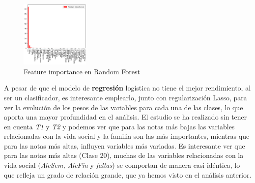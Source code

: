 \documentclass{article}
\begin{document}
\begin{figure}[ht]
  \centering
  \includegraphics[width=0.3\textwidth]{RF_var.png}
  \caption{Feature importance en Random Forest}\label{fig:t1t2}
\end{figure}

A pesar de que el modelo de \textbf{regresión} logística no tiene el mejor rendimiento, al ser un clasificador, es interesante emplearlo, junto con regularización Lasso, para ver la evolución de los pesos de las variables para cada una de las clases, lo que aporta una mayor profundidad en el análisis.
El estudio se ha realizado sin tener en cuenta \textit{T1} y \textit{T2} y podemos ver que para las notas más bajas las variables relacionadas con la vida social y la familia son las más importantes, mientras que para las notas más altas, influyen variables más variadas.
Es interesante ver que para las notas más altas (Clase 20), muchas de las variables relacionadas con la vida social (\textit{AlcSem, AlcFin} y \textit{faltas}) se comportan de manera casi idéntica, lo que refleja un grado de relación grande, que ya hemos visto en el análisis anterior.
\end{document}

